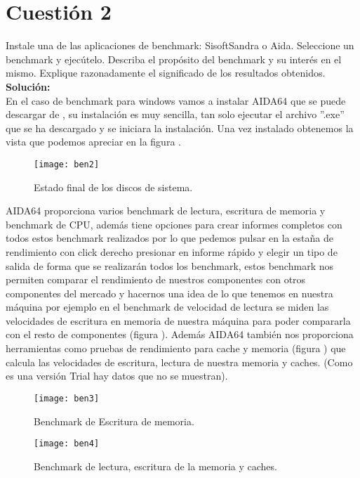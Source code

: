 \documentclass[a4paper, 10pt]{article} %
\begin{document}
\section{Cuestión 2}
Instale una de las aplicaciones de benchmark: SisoftSandra o Aida. Seleccione un benchmark y ejecútelo. Describa el propósito del benchmark y su interés en el mismo. Explique razonadamente el significado de los resultados obtenidos.\\
\textbf{Solución:}\\
En el caso de benchmark para windows vamos a instalar AIDA64 que se puede descargar de \cite{2}, su instalación es muy sencilla, tan solo ejecutar el archivo ''.exe'' que se ha descargado y se iniciara la instalación. Una vez instalado obtenemos la vista que podemos apreciar en la figura  .
\begin{figure}[H]
\centering 
\texttt{[image: ben2]} 
\caption{Estado final de los discos de sistema.} 
\label{contexto:figura} 
\end{figure}

 AIDA64 proporciona varios benchmark de lectura, escritura de memoria y benchmark de CPU, además tiene opciones para crear informes completos con todos estos benchmark realizados por lo que pedemos pulsar en la estaña de rendimiento con click derecho presionar en informe rápido y elegir un tipo de salida de forma que se realizarán todos los benchmark, estos benchmark nos permiten comparar el rendimiento de nuestros componentes con otros componentes del mercado y hacernos una idea de lo que tenemos en nuestra máquina por ejemplo en el benchmark de velocidad de lectura se miden las velocidades de escritura en memoria de nuestra máquina para poder compararla con el resto de componentes (figura ).
Además AIDA64 también nos proporciona herramientas como pruebas de rendimiento para cache y memoria (figura ) que calcula las velocidades de escritura, lectura de nuestra memoria y caches. (Como es una versión Trial hay datos que no se muestran).

\begin{figure}[H]
\centering 
\texttt{[image: ben3]} 
\caption{Benchmark de Escritura de memoria.} 
\label{contexto:figura} 
\end{figure}    
\begin{figure}[H]
\centering 
\texttt{[image: ben4]} 
\caption{Benchmark de lectura, escritura de la memoria y caches.} 
\label{contexto:figura} 
\end{figure}
\end{document}
